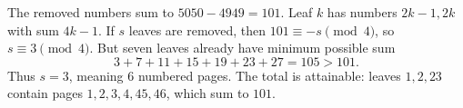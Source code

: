 The removed numbers sum to $5050-4949=101$. Leaf $k$ has numbers $2k-1,2k$ with sum $4k-1$. If $s$ leaves are removed, then $101\equiv-s\pmod4$, so $s\equiv3\pmod4$. But seven leaves already have minimum possible sum
\[
3+7+11+15+19+23+27=105>101.
\]
Thus $s=3$, meaning $\boxed6$ numbered pages. The total is attainable: leaves $1,2,23$ contain pages $1,2,3,4,45,46$, which sum to $101$.
